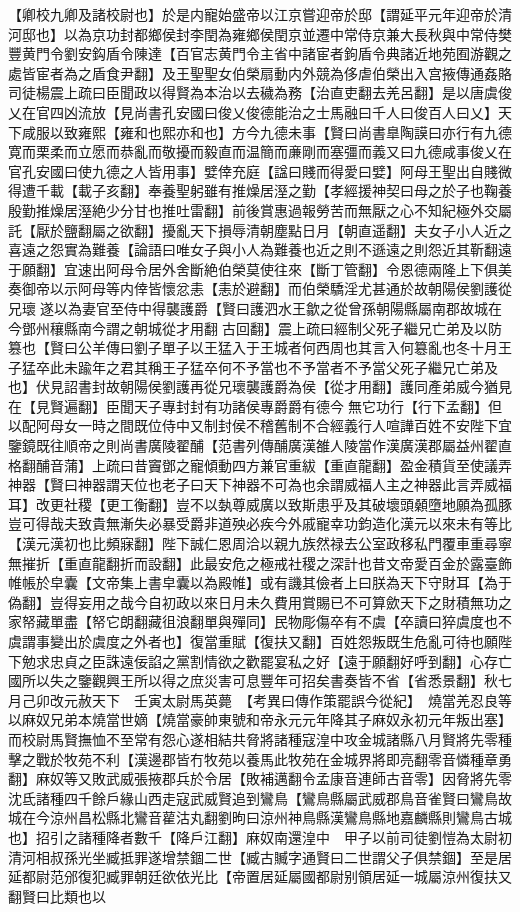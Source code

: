 【卿校九卿及諸校尉也】於是内寵始盛帝以江京嘗迎帝於邸【謂延平元年迎帝於清河邸也】以為京功封都鄉侯封李閏為雍鄉侯閏京並遷中常侍京兼大長秋與中常侍樊豐黄門令劉安鈎盾令陳達【百官志黄門令主省中諸宦者鉤盾令典諸近地苑囿游觀之處皆宦者為之盾食尹翻】及王聖聖女伯榮扇動内外競為侈虐伯榮出入宫掖傳通姦賂司徒楊震上疏曰臣聞政以得賢為本治以去穢為務【治直吏翻去羌呂翻】是以唐虞俊乂在官四凶流放【見尚書孔安國曰俊乂俊德能治之士馬融曰千人曰俊百人曰乂】天下咸服以致雍熙【雍和也熙亦和也】方今九德未事【賢曰尚書臯陶謨曰亦行有九德寛而栗柔而立愿而恭亂而敬擾而毅直而温簡而亷剛而塞彊而義又曰九德咸事俊乂在官孔安國曰使九德之人皆用事】嬖倖充庭【諡曰賤而得愛曰嬖】阿母王聖出自賤微得遭千載【載子亥翻】奉養聖躬雖有推燥居溼之勤【孝經援神契曰母之於子也鞠養殷勤推燥居溼絶少分甘也推吐雷翻】前後賞惠過報勞苦而無厭之心不知紀極外交屬託【厭於鹽翻屬之欲翻】擾亂天下損辱清朝塵點日月【朝直遥翻】夫女子小人近之喜遠之怨實為難養【論語曰唯女子與小人為難養也近之則不遜遠之則怨近其靳翻遠于願翻】宜速出阿母令居外舍斷絶伯榮莫使往來【斷丁管翻】令恩德兩隆上下俱美奏御帝以示阿母等内倖皆懷忿恚【恚於避翻】而伯榮驕淫尤甚通於故朝陽侯劉護從兄瓌遂以為妻官至侍中得襲護爵【賢曰護泗水王歙之從曾孫朝陽縣屬南郡故城在今鄧州穰縣南今謂之朝城從才用翻古回翻】震上疏曰經制父死子繼兄亡弟及以防篡也【賢曰公羊傳曰劉子單子以王猛入于王城者何西周也其言入何簒亂也冬十月王子猛卒此未踰年之君其稱王子猛卒何不予當也不予當者不予當父死子繼兄亡弟及也】伏見詔書封故朝陽侯劉護再從兄瓌襲護爵為侯【從才用翻】護同產弟威今猶見在【見賢遍翻】臣聞天子專封封有功諸侯專爵爵有德今無它功行【行下孟翻】但以配阿母女一時之間既位侍中又制封侯不稽舊制不合經義行人喧譁百姓不安陛下宜鑒鏡既往順帝之則尚書廣陵翟酺【范書列傳酺廣漢雒人陵當作漢廣漢郡屬益州翟直格翻酺音蒲】上疏曰昔竇鄧之寵傾動四方兼官重紱【重直龍翻】盈金積貨至使議弄神器【賢曰神器謂天位也老子曰天下神器不可為也余謂威福人主之神器此言弄威福耳】改更社稷【更工衡翻】豈不以埶尊威廣以致斯患乎及其破壞頭顙墮地願為孤豚豈可得哉夫致貴無漸失必暴受爵非道殃必疾今外戚寵幸功鈞造化漢元以來未有等比【漢元漢初也比頻寐翻】陛下誠仁恩周洽以親九族然禄去公室政移私門覆車重尋寧無摧折【重直龍翻折而設翻】此最安危之極戒社稷之深計也昔文帝愛百金於露臺飾帷帳於皁囊【文帝集上書皁囊以為殿帷】或有譏其儉者上曰朕為天下守財耳【為于偽翻】豈得妄用之哉今自初政以來日月未久費用賞賜已不可算歛天下之財積無功之家帑藏單盡【帑它朗翻藏徂浪翻單與殫同】民物彫傷卒有不虞【卒讀曰猝虞度也不虞謂事變出於虞度之外者也】復當重賦【復扶又翻】百姓怨叛既生危亂可待也願陛下勉求忠貞之臣誅遠佞諂之黨割情欲之歡罷宴私之好【遠于願翻好呼到翻】心存亡國所以失之鑒觀興王所以得之庶災害可息豐年可招矣書奏皆不省【省悉景翻】秋七月己卯改元赦天下　壬寅太尉馬英薨　【考異曰傳作策罷誤今從紀】　燒當羌忍良等以麻奴兄弟本燒當世嫡【燒當豪帥東號和帝永元元年降其子麻奴永初元年叛出塞】而校尉馬賢撫恤不至常有怨心遂相結共脅將諸種寇湟中攻金城諸縣八月賢將先零種擊之戰於牧苑不利【漢邊郡皆冇牧苑以養馬此牧苑在金城界將即亮翻零音憐種章勇翻】麻奴等又敗武威張掖郡兵於令居【敗補邁翻令孟康音連師古音零】因脅將先零沈氐諸種四千餘戶緣山西走寇武威賢追到鸞鳥【鸞鳥縣屬武威郡鳥音雀賢曰鸞鳥故城在今涼州昌松縣北鸞音雚沽丸翻劉昫曰涼州神鳥縣漢鸞鳥縣地嘉麟縣則鸞鳥古城也】招引之諸種降者數千【降戶江翻】麻奴南還湟中　甲子以前司徒劉愷為太尉初清河相叔孫光坐臧抵罪遂增禁錮二世【臧古贓字通賢曰二世謂父子俱禁錮】至是居延都尉范邠復犯臧罪朝廷欲依光比【帝置居延屬國都尉别領居延一城屬涼州復扶又翻賢曰比類也以